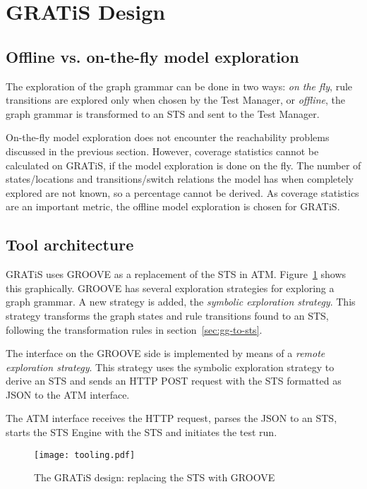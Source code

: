 \section{GRATiS Design}\label{sec:gratis-design}

\subsection{Offline vs. on-the-fly model exploration}
The exploration of the graph grammar can be done in two ways: \textit{on the fly}, rule transitions are explored only when chosen by the Test Manager, or \textit{offline}, the graph grammar is transformed to an STS and sent to the Test Manager.

On-the-fly model exploration does not encounter the reachability problems discussed in the previous section. However, coverage statistics cannot be calculated on GRATiS, if the model exploration is done on the fly. The number of states/locations and transitions/switch relations the model has when completely explored are not known, so a percentage cannot be derived. As coverage statistics are an important metric, the offline model exploration is chosen for GRATiS.

\subsection{Tool architecture}
GRATiS uses GROOVE as a replacement of the STS in ATM. Figure~\ref{fig:tooling} shows this graphically. GROOVE has several exploration strategies for exploring a graph grammar. A new strategy is added, the \textit{symbolic exploration strategy}. This strategy transforms the graph states and rule transitions found to an STS, following the transformation rules in section~\ref{sec:gg-to-sts}.

The interface on the GROOVE side is implemented by means of a \textit{remote exploration strategy}. This strategy uses the symbolic exploration strategy to derive an STS and sends an HTTP POST request with the STS formatted as JSON to the ATM interface.

The ATM interface receives the HTTP request, parses the JSON to an STS, starts the STS Engine with the STS and initiates the test run.

\begin{figure}[ht]
  \begin{center}
    \texttt{[image: tooling.pdf]}
  \end{center}
  \caption{The GRATiS design: replacing the STS with GROOVE}
  \label{fig:tooling}
\end{figure}
